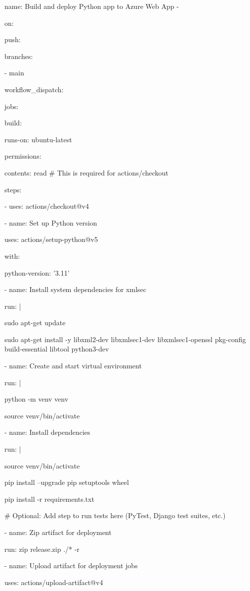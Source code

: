 name: Build and deploy Python app to Azure Web App - 

on:

  push:

    branches:

      - main

  workflow_dispatch:

jobs:

  build:

    runs-on: ubuntu-latest

    permissions:

      contents: read # This is required for actions/checkout

    steps:

      - uses: actions/checkout@v4

      - name: Set up Python version

        uses: actions/setup-python@v5

        with:

          python-version: '3.11'

      - name: Install system dependencies for xmlsec

        run: |

          sudo apt-get update

          sudo apt-get install -y libxml2-dev libxmlsec1-dev libxmlsec1-openssl pkg-config build-essential libtool python3-dev

      - name: Create and start virtual environment

        run: |

          python -m venv venv

          source venv/bin/activate

      - name: Install dependencies

        run: |

          source venv/bin/activate

          pip install --upgrade pip setuptools wheel

          pip install -r requirements.txt

      # Optional: Add step to run tests here (PyTest, Django test suites, etc.)

      - name: Zip artifact for deployment

        run: zip release.zip ./* -r

      - name: Upload artifact for deployment jobs

        uses: actions/upload-artifact@v4

